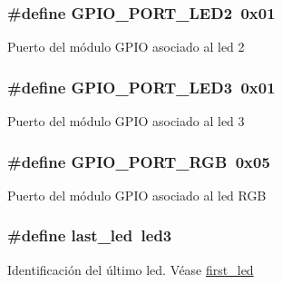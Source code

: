 \subsubsection[{\texorpdfstring{G\+P\+I\+O\+\_\+\+P\+O\+R\+T\+\_\+\+L\+E\+D2}{GPIO_PORT_LED2}}]{\setlength{\rightskip}{0pt plus 5cm}\#define G\+P\+I\+O\+\_\+\+P\+O\+R\+T\+\_\+\+L\+E\+D2~0x01}\hypertarget{group__hardware_gab971c6f67d136a9b870fac0f500685d4}{}\label{group__hardware_gab971c6f67d136a9b870fac0f500685d4}
Puerto del módulo G\+P\+IO asociado al led 2 
\subsubsection[{\texorpdfstring{G\+P\+I\+O\+\_\+\+P\+O\+R\+T\+\_\+\+L\+E\+D3}{GPIO_PORT_LED3}}]{\setlength{\rightskip}{0pt plus 5cm}\#define G\+P\+I\+O\+\_\+\+P\+O\+R\+T\+\_\+\+L\+E\+D3~0x01}\hypertarget{group__hardware_ga8b63f7f606f2b1ec7d88205ee6c514ea}{}\label{group__hardware_ga8b63f7f606f2b1ec7d88205ee6c514ea}
Puerto del módulo G\+P\+IO asociado al led 3 
\subsubsection[{\texorpdfstring{G\+P\+I\+O\+\_\+\+P\+O\+R\+T\+\_\+\+R\+GB}{GPIO_PORT_RGB}}]{\setlength{\rightskip}{0pt plus 5cm}\#define G\+P\+I\+O\+\_\+\+P\+O\+R\+T\+\_\+\+R\+GB~0x05}\hypertarget{group__hardware_ga9e2ed2756af597d0ec2ee618ef235c7e}{}\label{group__hardware_ga9e2ed2756af597d0ec2ee618ef235c7e}
Puerto del módulo G\+P\+IO asociado al led R\+GB 
\subsubsection[{\texorpdfstring{last\+\_\+led}{last_led}}]{\setlength{\rightskip}{0pt plus 5cm}\#define last\+\_\+led~{\bf led3}}\hypertarget{group__hardware_ga6d4d3ee57587d8e08816b804150c29f8}{}\label{group__hardware_ga6d4d3ee57587d8e08816b804150c29f8}
Identificación del último led. Véase \hyperlink{group__hardware_ga43a19ad1766c3719e591430d601496f7}{first\+\_\+led} 

